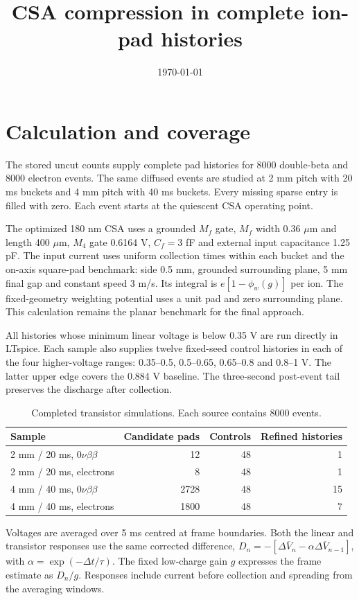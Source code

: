 \documentclass[11pt,a4paper]{article}
\title{CSA compression in complete ion-pad histories}
\date{\today}
\begin{document}
\maketitle
\section{Calculation and coverage}
The stored uncut counts supply complete pad histories for 8000 double-beta and
8000 electron events. The same diffused events are studied at 2 mm pitch with
20 ms buckets and 4 mm pitch with 40 ms buckets. Every missing sparse entry is
filled with zero. Each event starts at the quiescent CSA operating point.

The optimized 180 nm CSA uses a grounded $M_f$ gate, $M_f$ width 0.36 $\mu$m and
length 400 $\mu$m, $M_4$ gate 0.6164 V, $C_f=3$ fF and external input
capacitance 1.25 pF. The input current uses uniform collection times within each
bucket and the on-axis square-pad benchmark: side 0.5 mm, grounded surrounding
plane, 5 mm final gap and constant speed 3 m/s. Its integral is
$e[1-\phi_w(g)]$ per ion. The fixed-geometry weighting potential uses a unit pad
and zero surrounding plane. This calculation remains the planar benchmark for
the final approach.

All histories whose minimum linear voltage is below 0.35 V are run directly
in LTspice. Each sample also supplies twelve fixed-seed control histories in
each of the four higher-voltage ranges: 0.35--0.5, 0.5--0.65, 0.65--0.8 and
0.8--1 V. The latter upper edge covers the 0.884 V baseline. The three-second
post-event tail preserves the discharge after collection.

\begin{table}[ht]\centering
\begin{tabular}{lrrr}\toprule
Sample & Candidate pads & Controls & Refined histories\\\midrule
2 mm / 20 ms, $0\nu\beta\beta$ & 12 & 48 & 1 \\
2 mm / 20 ms, electrons & 8 & 48 & 1 \\
4 mm / 40 ms, $0\nu\beta\beta$ & 2728 & 48 & 15 \\
4 mm / 40 ms, electrons & 1800 & 48 & 7 \\
\bottomrule\end{tabular}
\caption{Completed transistor simulations. Each source contains 8000 events.}
\end{table}

Voltages are averaged over 5 ms centred at frame boundaries. Both the linear
and transistor responses use the same corrected difference,
$D_n=-[\Delta\overline V_n-\alpha\Delta\overline V_{n-1}]$, with
$\alpha=\exp(-\Delta t/\tau)$. The fixed low-charge gain $g$ expresses the
frame estimate as $D_n/g$. Responses include current before collection and
spreading from the averaging windows.
\end{document}
